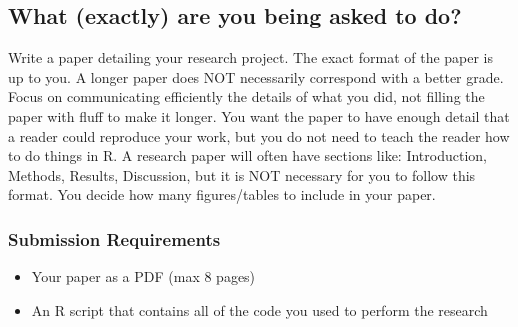 \documentclass{article}
\begin{document}
    \subsection*{\sc What (exactly) are you being asked to do?}

      Write a paper detailing your research project. The exact format of the paper is up to you. A longer paper does NOT necessarily correspond with a better grade. Focus on communicating efficiently the details of what you did, not filling the paper with fluff to make it longer. You want the paper to have enough detail that a reader could reproduce your work, but you do not need to teach the reader how to do things in R. A research paper will often have sections like: Introduction, Methods, Results, Discussion, but it is NOT necessary for you to follow this format. You decide how many figures/tables to include in your paper.
  
      \subsubsection*{\sc Submission Requirements}

        \begin{itemize}
          \item Your paper as a PDF (max 8 pages)
          \item An R script that contains all of the code you used to perform the research
        \end{itemize}
   
% 
\end{document}
